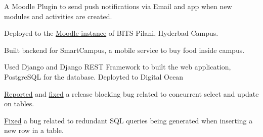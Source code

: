 \documentclass[]{abhijeet_viswa-deedy-resume-openfont}
\begin{document}
\begin{minipage}[t]{0.70\textwidth}
\begin{tightemize}
 \item A Moodle Plugin to send push notifications via Email and app when new modules and activities are created.
 \item Deployed to the \href{https://td.bits-hyderabad.ac.in}{Moodle instance} of BITS Pilani, Hyderbad Campus.
\end{tightemize}
\subsectionsep

\begin{tightemize}
 \item Built backend for SmartCampus, a mobile service to buy food inside campus.
 \item Used Django and Django REST Framework to built the web application, PostgreSQL for the database. Deployted to Digital Ocean
\end{tightemize}
\subsectionsep

\begin{tightemize}
\item \href{https://code.djangoproject.com/ticket/31246}{Reported} and \href{https://github.com/django/django/pull/12434}{fixed}
a release blocking bug related to concurrent select and update on tables.
\item \justifying\href{https://github.com/django/django/pull/12496}{Fixed} a bug related to redundant SQL queries being generated when
inserting a new row in a table.
\end{tightemize}
\primarysectionsep

\end{minipage}
\end{document}
